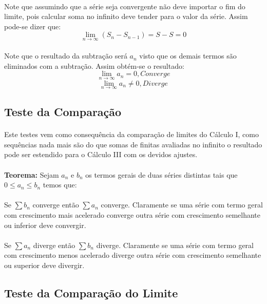 \documentclass{article}
\begin{document}
\begin{enumerate}[rightmargin = \leftmargin]
        \paragraph{}Note que assumindo que a série seja convergente não deve importar o fim do limite, pois calcular soma no infinito deve tender para o valor da série. Assim pode-se dizer que:
            \[\lim_{n\to\infty}(S_{n}-S_{n-1}) = S - S = 0\]
        \paragraph{}Note que o resultado da subtração será $a_{n}$ visto que os demais termos são eliminados com a subtração. Assim obtém-se o resultado:
            \[\lim_{n\to\infty}a_{n} = 0, Converge\]
            \[\lim_{n\to\infty}a_{n} \ne 0, Diverge\]
    
    \subsection{Teste da Comparação}
        \paragraph{}Este testes vem como consequência da comparação de limites do Cálculo I, como sequências nada mais são do que somas de finitas avaliadas no infinito o resultado pode ser estendido para o Cálculo III com os devidos ajustes.
        \paragraph{}\textbf{Teorema:} Sejam $a_{n}$ e $b_{n}$ os termos gerais de duas séries distintas tais que $0 \le a_{n} \le b_{n}$ temos que:
        \paragraph{}Se $\sum b_{n}$ converge então $\sum a_{n}$ converge. Claramente se uma série com termo geral com crescimento mais acelerado converge outra série com crescimento semelhante ou inferior deve convergir.
        \paragraph{}Se $\sum a_{n}$ diverge então $\sum b_{n}$ diverge. Claramente se uma série com termo geral com crescimento menos acelerado diverge outra série com crescimento semelhante ou superior deve divergir.
    \subsection{Teste da Comparação do Limite}

\end{enumerate}
\end{document}
